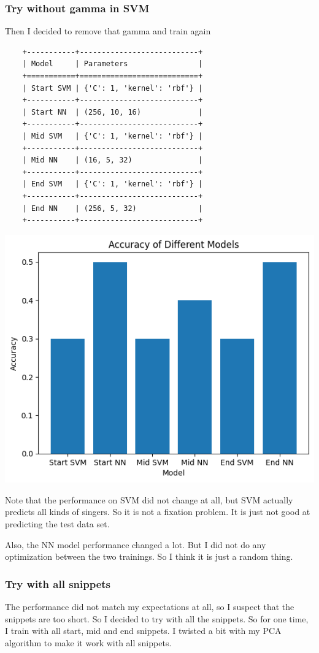 \documentclass[letterpaper,12pt]{article}
\begin{document}
\subsubsection{Try without gamma in SVM}
Then I decided to remove that gamma and train again\begin{lstlisting}
    +-----------+---------------------------+
    | Model     | Parameters                |
    +===========+===========================+
    | Start SVM | {'C': 1, 'kernel': 'rbf'} |
    +-----------+---------------------------+
    | Start NN  | (256, 10, 16)             |
    +-----------+---------------------------+
    | Mid SVM   | {'C': 1, 'kernel': 'rbf'} |
    +-----------+---------------------------+
    | Mid NN    | (16, 5, 32)               |
    +-----------+---------------------------+
    | End SVM   | {'C': 1, 'kernel': 'rbf'} |
    +-----------+---------------------------+
    | End NN    | (256, 5, 32)              |
    +-----------+---------------------------+
    \end{lstlisting}
\includegraphics*[scale = 0.8]{./SVM fixed bar.png}

Note that the performance on SVM did not change at all, but SVM actually predicts all kinds of singers. So it is not a fixation problem. It is just not good at predicting the test data set.

Also, the NN model performance changed a lot. But I did not do any optimization between the two trainings. So I think it is just a random thing.

\subsubsection{Try with all snippets}
The performance did not match my expectations at all, so I suspect that the snippets are too short. So I decided to try with all the snippets. So for one time, I train with all start, mid and end snippets. I twisted a bit with my PCA algorithm to make it work with all snippets.
\end{document}
